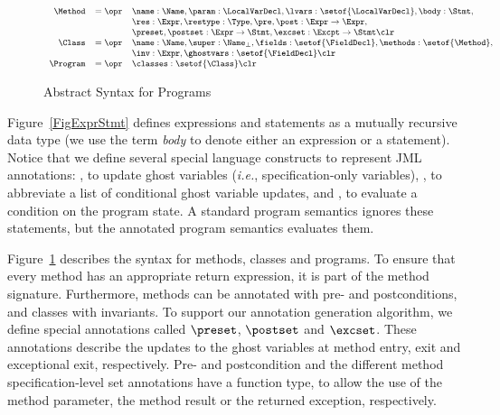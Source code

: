\begin{figure}[t]
\[{\small
\begin{array}{rcl}
\Method & = \opr & \name : \Name,
                   \param : \LocalVarDecl,
                   \lvars : \setof{\LocalVarDecl},
                   \body : \Stmt,\\
        &        & \res : \Expr,
                   \restype : \Type,
                   \pre, \post : \Expr \rightarrow \Expr, \\
        &        & \preset, \postset : \Expr \rightarrow \Stmt,
                   \excset : \Excpt \rightarrow \Stmt \clr \\
\Class & = \opr & \name : \Name,
                  \super : \Name_{\bot},
                  \fields : \setof{\FieldDecl},
                  \methods : \setof{\Method},\\
        &       & \inv : \Expr,
                  \ghostvars : \setof{\FieldDecl} \clr\\
\Program & = \opr & \classes : \setof{\Class} \clr
\end{array}}
\]
\caption{Abstract Syntax for Programs}\label{FigProgram}
\end{figure}


Figure~\ref{FigExprStmt} defines expressions and statements as a
mutually recursive data type (we use the term \emph{body} to denote
either an expression or a statement). Notice that we define several special
language constructs to represent JML annotations: \Set,
to update ghost variables (\emph{i.e.}, specification-only variables),
\CaseJML, to abbreviate a list of conditional ghost variable updates,
and \Assert, to evaluate a condition on the program state. A standard
program semantics ignores these statements, but the annotated program
semantics evaluates them.

Figure~\ref{FigProgram} describes the syntax for methods,
classes and programs. To ensure that every method has an appropriate
return expression, it is part of the method signature.
Furthermore, methods can be annotated with pre- and postconditions, and
classes with invariants. To support our annotation generation
algorithm, we define special annotations called
\(\preset\), \(\postset\) and \(\excset\). These annotations describe
the updates to the ghost variables at method entry, exit and
exceptional exit, respectively.
Pre- and postcondition and the different method specification-level set
annotations have a function type, to allow the use of the method parameter,
the method result or the returned exception, respectively. 


